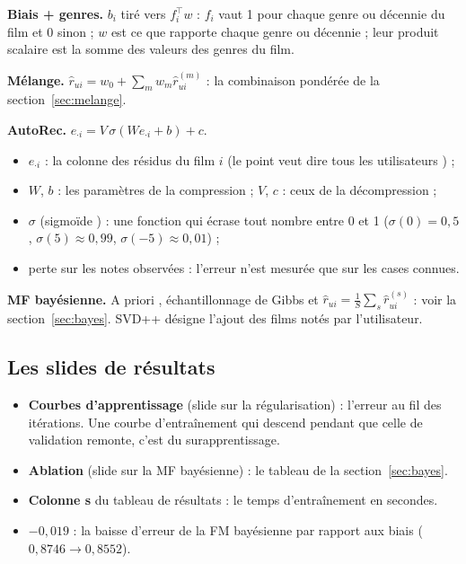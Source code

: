 \documentclass[11pt,a4paper]{article}
\newcommand{\rhat}{\hat r}
\begin{document}
\textbf{Biais + genres.} $b_i$ tiré vers $f_i^\top w$ : $f_i$ vaut 1 pour chaque genre
ou décennie du film et 0 sinon ; $w$ est ce que rapporte chaque genre ou décennie ; leur
produit scalaire est la somme des valeurs des genres du film.

\textbf{Mélange.} $\rhat_{ui} = w_0 + \sum_m w_m \rhat^{(m)}_{ui}$ : la combinaison
pondérée de la section~\ref{sec:melange}.

\textbf{AutoRec.} $\hat{e}_{\cdot i} = V\,\sigma(W e_{\cdot i} + b) + c$.
\begin{itemize}
  \item $e_{\cdot i}$ : la colonne des résidus du film $i$ (le point veut dire \og tous les
        utilisateurs \fg) ;
  \item $W$, $b$ : les paramètres de la compression ; $V$, $c$ : ceux de la décompression ;
  \item $\sigma$ (\og sigmoïde \fg) : une fonction qui écrase tout nombre entre 0 et 1
        ($\sigma(0) = 0{,}5$, $\sigma(5) \approx 0{,}99$, $\sigma(-5) \approx 0{,}01$) ;
  \item \og perte sur les notes observées \fg : l'erreur n'est mesurée que sur les cases connues.
\end{itemize}

\textbf{MF bayésienne.} \og A priori \fg, échantillonnage de Gibbs et
$\rhat_{ui} = \frac1S \sum_s \rhat^{(s)}_{ui}$ : voir la section~\ref{sec:bayes}.
\og SVD++ \fg désigne l'ajout des films notés par l'utilisateur.

\subsection{Les slides de résultats}

\begin{itemize}
  \item \textbf{Courbes d'apprentissage} (slide sur la régularisation) : l'erreur au fil
        des itérations. Une courbe d'entraînement qui descend pendant que celle de
        validation remonte, c'est du surapprentissage.
  \item \textbf{Ablation} (slide sur la MF bayésienne) : le tableau de la
        section~\ref{sec:bayes}.
  \item \textbf{Colonne \og s \fg} du tableau de résultats : le temps d'entraînement en secondes.
  \item \textbf{$-0{,}019$} : la baisse d'erreur de la FM bayésienne par rapport aux biais
        ($0{,}8746 \to 0{,}8552$).
\end{itemize}
\end{document}
